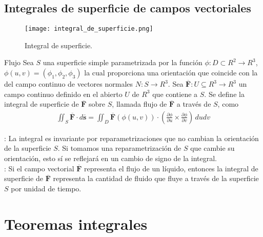 \documentclass[a4paper, twoside]{article}
\numberwithin{equation}{section}
\numberwithin{figure}{section}
\numberwithin{table}{section}
\newcommand{\vect}[1]{\overline{\textbf{#1}}}
\begin{document}
\subsection{Integrales de superficie de campos vectoriales}
\begin{minipage}{0.3\textwidth}
	\begin{figure}[H]
		\centering
		\texttt{[image: integral\_de\_superficie.png]}
		\caption{Integral de superficie.}
	\end{figure}
\end{minipage}
\begin{minipage}{0.6\textwidth}
	\begin{definicion*}{Flujo}
		Sea $S$ una superficie simple parametrizada por la función $\phi: D \subset R^2 \to R^3$, $\phi(u,v) = (\phi_1,\phi_2,\phi_3)$ la cual proporciona una orientación que coincide con la del campo continuo de vectores normales $N: S \to R^3$. Sea $\vect{F}: U \subseteq R^3 \to R^3$ un campo continuo definido en el abierto $U$ de $R^3$ que contiene a $S$. Se define la integral de superficie de $\vect{F}$ sobre $S$, llamada flujo de $\vect{F}$ a través de $S$, como
		\begin{align}
			\iint_{S}\vect{F} \cdot d\vect{s} = \iint_{D}\vect{F}(\phi(u,v)) \cdot \left(\frac{\partial\phi}{\partial u} \times \frac{\partial\phi}{\partial v}\right)\, dudv
		\end{align}
		
		: La integral es invariante por reparametrizaciones que no cambian la orientación de la superficie $S$. Si tomamos una reparametrización de $S$ que cambie su orientación, esto sí se reflejará en un cambio de signo de la integral.\\
		
		: Si el campo vectorial $\vect{F}$ representa el flujo de un líquido, entonces la integral de superficie de $\vect{F}$ representa la cantidad de fluido que fluye a través de la superficie $S$ por unidad de tiempo.
	\end{definicion*}
\end{minipage}

\newpage
\section{Teoremas integrales}
\end{document}

